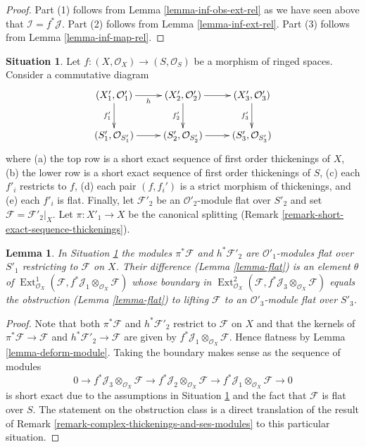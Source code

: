 \documentclass{stacks-project}
\theoremstyle{plain}
\newtheorem{lemma}[subsection]{Lemma}
\theoremstyle{definition}
\newtheorem{situation}[subsection]{Situation}
\theoremstyle{remark}
\numberwithin{equation}{subsection}
\def\Ext{\mathop{\mathrm{Ext}}\nolimits}
\begin{document}
\begin{proof}
Part (1) follows from Lemma \ref{lemma-inf-obs-ext-rel}
as we have seen above that $\mathcal{I} = f^*\mathcal{J}$.
Part (2) follows from Lemma \ref{lemma-inf-ext-rel}.
Part (3) follows from Lemma \ref{lemma-inf-map-rel}.
\end{proof}

\begin{situation}
\label{situation-ses-flat-thickenings}
Let $f : (X, \mathcal{O}_X) \to (S, \mathcal{O}_S)$ be a morphism of
ringed spaces. Consider a commutative diagram
$$
\xymatrix{
(X'_1, \mathcal{O}'_1) \ar[r]_h \ar[d]_{f'_1} &
(X'_2, \mathcal{O}'_2) \ar[r] \ar[d]_{f'_2} &
(X'_3, \mathcal{O}'_3) \ar[d]_{f'_3} \\
(S'_1, \mathcal{O}_{S'_1}) \ar[r] &
(S'_2, \mathcal{O}_{S'_2}) \ar[r] &
(S'_3, \mathcal{O}_{S'_3})
}
$$
where (a) the top row is a short exact sequence of first order thickenings
of $X$, (b) the lower row is a short exact sequence of first order
thickenings of $S$, (c) each $f'_i$ restricts to $f$, (d) each pair
$(f, f_i')$ is a strict morphism of thickenings, and (e) each $f'_i$ is flat.
Finally, let $\mathcal{F}'_2$ be an $\mathcal{O}'_2$-module flat over
$S'_2$ and set $\mathcal{F} = \mathcal{F}'_2|_X$. Let $\pi : X'_1 \to X$
be the canonical splitting
(Remark \ref{remark-short-exact-sequence-thickenings}).
\end{situation}

\begin{lemma}
\label{lemma-verify-iv}
In Situation \ref{situation-ses-flat-thickenings} the modules
$\pi^*\mathcal{F}$ and $h^*\mathcal{F}'_2$ are $\mathcal{O}'_1$-modules
flat over $S'_1$ restricting to $\mathcal{F}$ on $X$.
Their difference (Lemma \ref{lemma-flat}) is an element
$\theta$ of $\Ext^1_{\mathcal{O}_X}(
\mathcal{F}, f^*\mathcal{J}_1 \otimes_{\mathcal{O}_X} \mathcal{F})$
whose boundary in
$\Ext^2_{\mathcal{O}_X}(
\mathcal{F}, f^*\mathcal{J}_3 \otimes_{\mathcal{O}_X} \mathcal{F})$
equals the obstruction (Lemma \ref{lemma-flat})
to lifting $\mathcal{F}$ to an $\mathcal{O}'_3$-module flat over $S'_3$.
\end{lemma}

\begin{proof}
Note that both $\pi^*\mathcal{F}$ and $h^*\mathcal{F}'_2$
restrict to $\mathcal{F}$ on $X$ and that the kernels of
$\pi^*\mathcal{F} \to \mathcal{F}$ and $h^*\mathcal{F}'_2 \to \mathcal{F}$
are given by $f^*\mathcal{J}_1 \otimes_{\mathcal{O}_X} \mathcal{F}$.
Hence flatness by Lemma \ref{lemma-deform-module}.
Taking the boundary makes sense as the sequence of modules
$$
0 \to f^*\mathcal{J}_3 \otimes_{\mathcal{O}_X} \mathcal{F} \to
f^*\mathcal{J}_2 \otimes_{\mathcal{O}_X} \mathcal{F} \to
f^*\mathcal{J}_1 \otimes_{\mathcal{O}_X} \mathcal{F} \to 0
$$
is short exact due to the assumptions in
Situation \ref{situation-ses-flat-thickenings}
and the fact that $\mathcal{F}$ is flat over $S$.
The statement on the obstruction class is a direct translation
of the result of
Remark \ref{remark-complex-thickenings-and-ses-modules}
to this particular situation.
\end{proof}
\end{document}
